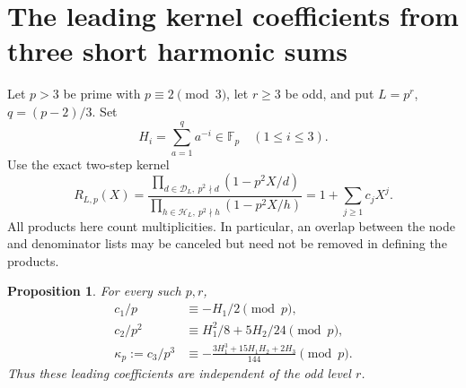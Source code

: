 \documentclass[11pt,letterpaper]{article}
\newtheorem{proposition}[theorem]{Proposition}
\numberwithin{equation}{section}
\begin{document}
\section{The leading kernel coefficients from three short harmonic sums}\label{loc-VII-16}
\label{VII-sec:E7harmonic}
Let $p>3$ be prime with $p\equiv2\pmod3$, let $r\ge3$ be odd,
and put $L=p^r$, $q=(p-2)/3$. Set
\[
 H_i=\sum_{a=1}^{q}a^{-i}\in\mathbb F_p\quad(1\le i\le3).
\]
Use the exact two-step kernel
\[
 R_{L,p}(X)=
 \frac{\prod_{d\in\mathcal D_L,\ p^2\nmid d}(1-p^2X/d)}
 {\prod_{h\in\mathcal H_L,\ p^2\nmid h}(1-p^2X/h)}
 =1+\sum_{j\ge1}c_jX^j.
\]
All products here count multiplicities. In particular, an overlap
between the node and denominator lists may be canceled but need
not be removed in defining the products.

\begin{proposition}\label{VII-E7:harmonic-kernel}
For every such $p,r$,
\begin{align*}
 c_1/p&\equiv-H_1/2\pmod p,\\
 c_2/p^2&\equiv H_1^2/8+5H_2/24\pmod p,\\
 \kappa_p:=c_3/p^3&\equiv
 -\frac{3H_1^3+15H_1H_2+2H_3}{144}\pmod p.
\end{align*}
Thus these leading coefficients are independent of the odd level $r$.
\end{proposition}
\end{document}
